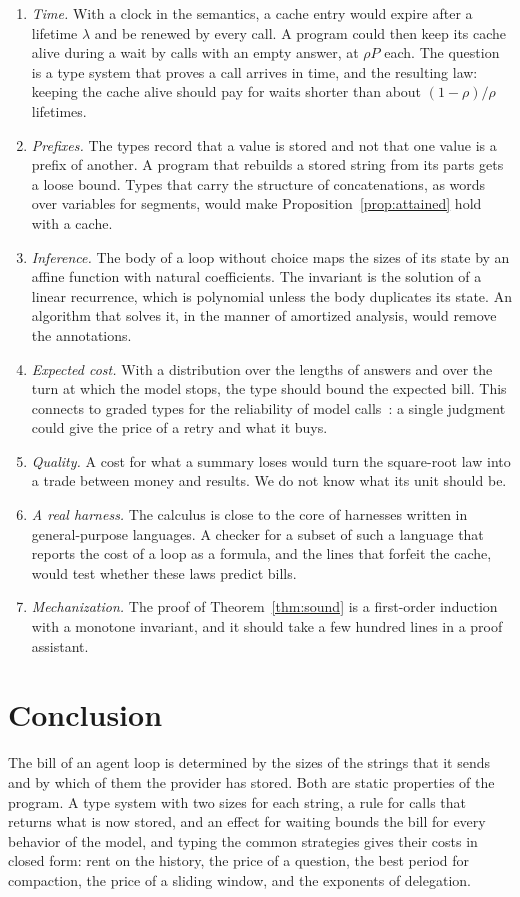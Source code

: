 \documentclass[acmsmall,nonacm,screen]{acmart}
\begin{document}
\begin{enumerate}
\item \emph{Time.} With a clock in the semantics, a cache entry would expire after a lifetime
$\lambda$ and be renewed by every call. A program could then keep its cache alive during a
wait by calls with an empty answer, at $\rho P$ each. The question is a type system that
proves a call arrives in time, and the resulting law: keeping the cache alive should pay for
waits shorter than about $(1-\rho)/\rho$ lifetimes.
\item \emph{Prefixes.} The types record that a value is stored and not that one value is a
prefix of another. A program that rebuilds a stored string from its parts gets a loose bound.
Types that carry the structure of concatenations, as words over variables for segments, would
make Proposition~\ref{prop:attained} hold with a cache.
\item \emph{Inference.} The body of a loop without choice maps the sizes of its state by an
affine function with natural coefficients. The invariant is the solution of a linear
recurrence, which is polynomial unless the body duplicates its state. An algorithm that
solves it, in the manner of amortized analysis, would remove the annotations.
\item \emph{Expected cost.} With a distribution over the lengths of answers and over the turn
at which the model stops, the type should bound the expected bill. This connects to graded
types for the reliability of model calls~\cite{tpp3}: a single judgment could give the price
of a retry and what it buys.
\item \emph{Quality.} A cost for what a summary loses would turn the square-root law into a
trade between money and results. We do not know what its unit should be.
\item \emph{A real harness.} The calculus is close to the core of harnesses written in
general-purpose languages. A checker for a subset of such a language that reports the cost of
a loop as a formula, and the lines that forfeit the cache, would test whether these laws
predict bills.
\item \emph{Mechanization.} The proof of Theorem~\ref{thm:sound} is a first-order induction
with a monotone invariant, and it should take a few hundred lines in a proof assistant.
\end{enumerate}

\section{Conclusion}

The bill of an agent loop is determined by the sizes of the strings that it sends and by which
of them the provider has stored. Both are static properties of the program. A type system
with two sizes for each string, a rule for calls that returns what is now stored, and an
effect for waiting bounds the bill for every behavior of the model, and typing the common
strategies gives their costs in closed form: rent on the history, the price of a question,
the best period for compaction, the price of a sliding window, and the exponents of
delegation.



\end{document}
